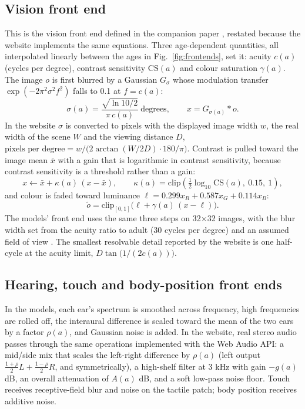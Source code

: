 \documentclass{article}
\begin{document}
\subsection{Vision front end}

This is the vision front end defined in the companion paper \autocite{mohapatra2026learn}, restated because the website implements the same equations. Three age-dependent quantities, all interpolated linearly between the ages in Fig.~\ref{fig:frontends}, set it: acuity $c(a)$ (cycles per degree), contrast sensitivity $\mathrm{CS}(a)$ and colour saturation $\gamma(a)$. The image $o$ is first blurred by a Gaussian $G_\sigma$ whose modulation transfer $\exp(-2\pi^2\sigma^2 f^2)$ falls to 0.1 at $f = c(a)$:
\begin{equation}\label{eq:blur}
\sigma(a) = \frac{\sqrt{\ln 10 / 2}}{\pi\, c(a)}\ \text{degrees},\qquad x = G_{\sigma(a)} * o .
\end{equation}
In the website $\sigma$ is converted to pixels with the displayed image width $w$, the real width of the scene $W$ and the viewing distance $D$, $\text{pixels per degree} = w / \big(2\arctan(W/2D)\cdot 180/\pi\big)$. Contrast is pulled toward the image mean $\bar x$ with a gain that is logarithmic in contrast sensitivity, because contrast sensitivity is a threshold rather than a gain:
\begin{equation}\label{eq:contrast}
x \leftarrow \bar x + \kappa(a)\,(x - \bar x),\qquad \kappa(a) = \mathrm{clip}\!\left(\tfrac12 \log_{10}\mathrm{CS}(a),\ 0.15,\ 1\right),
\end{equation}
and colour is faded toward luminance $\ell = 0.299x_R + 0.587x_G + 0.114x_B$:
\begin{equation}\label{eq:colour}
\tilde o = \mathrm{clip}_{[0,1]}\big(\ell + \gamma(a)\,(x - \ell)\big).
\end{equation}
The models' front end uses the same three steps on 32$\times$32 images, with the blur width set from the acuity ratio to adult (30 cycles per degree) and an assumed field of view \autocite{mohapatra2026learn}. The smallest resolvable detail reported by the website is one half-cycle at the acuity limit, $D\tan\!\big(1/(2c(a))\big)$.

\subsection{Hearing, touch and body-position front ends}

In the models, each ear's spectrum is smoothed across frequency, high frequencies are rolled off, the interaural difference is scaled toward the mean of the two ears by a factor $\rho(a)$, and Gaussian noise is added. In the website, real stereo audio passes through the same operations implemented with the Web Audio API: a mid/side mix that scales the left-right difference by $\rho(a)$ (left output $\tfrac{1+\rho}{2}L + \tfrac{1-\rho}{2}R$, and symmetrically), a high-shelf filter at 3 kHz with gain $-g(a)$ dB, an overall attenuation of $A(a)$ dB, and a soft low-pass noise floor. Touch receives receptive-field blur and noise on the tactile patch; body position receives additive noise.
\end{document}
